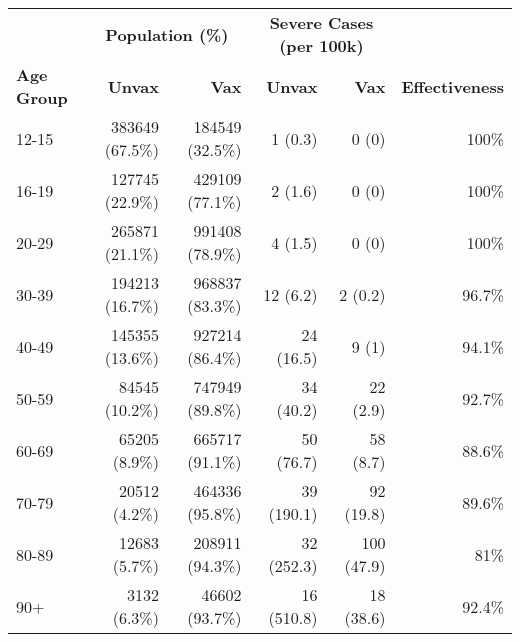 \begin{table}[ht]
\centering
\begin{tabular}{lrrrrr}
  \toprule
  & \multicolumn{2}{c}{\textbf{Population (\%)}} & \multicolumn{2}{c}{\textbf{Severe Cases (per 100k)}} & \\
 \cmidrule(lr){2-3} \cmidrule(lr){4-5}
 \textbf{Age Group} & \textbf{Unvax} & \textbf{Vax} & \textbf{Unvax} & \textbf{Vax} & \textbf{Effectiveness} \\
 \midrule
12-15 & 383649 (67.5\%) & 184549 (32.5\%) & 1 (0.3) & 0 (0) & 100\% \\ 
  16-19 & 127745 (22.9\%) & 429109 (77.1\%) & 2 (1.6) & 0 (0) & 100\% \\ 
  20-29 & 265871 (21.1\%) & 991408 (78.9\%) & 4 (1.5) & 0 (0) & 100\% \\ 
  30-39 & 194213 (16.7\%) & 968837 (83.3\%) & 12 (6.2) & 2 (0.2) & 96.7\% \\ 
  40-49 & 145355 (13.6\%) & 927214 (86.4\%) & 24 (16.5) & 9 (1) & 94.1\% \\ 
  50-59 & 84545 (10.2\%) & 747949 (89.8\%) & 34 (40.2) & 22 (2.9) & 92.7\% \\ 
  60-69 & 65205 (8.9\%) & 665717 (91.1\%) & 50 (76.7) & 58 (8.7) & 88.6\% \\ 
  70-79 & 20512 (4.2\%) & 464336 (95.8\%) & 39 (190.1) & 92 (19.8) & 89.6\% \\ 
  80-89 & 12683 (5.7\%) & 208911 (94.3\%) & 32 (252.3) & 100 (47.9) & 81\% \\ 
  90+ & 3132 (6.3\%) & 46602 (93.7\%) & 16 (510.8) & 18 (38.6) & 92.4\% \\ 
   \bottomrule
\end{tabular}
\end{table}
